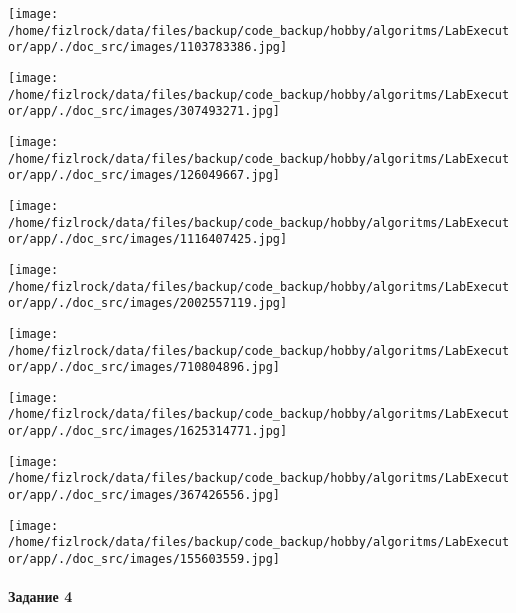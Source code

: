 \documentclass[a4paper, 12pt]{article}
\begin{document}
\texttt{[image: /home/fizlrock/data/files/backup/code\_backup/hobby/algoritms/LabExecutor/app/./doc\_src/images/1103783386.jpg]}

\texttt{[image: /home/fizlrock/data/files/backup/code\_backup/hobby/algoritms/LabExecutor/app/./doc\_src/images/307493271.jpg]}

\texttt{[image: /home/fizlrock/data/files/backup/code\_backup/hobby/algoritms/LabExecutor/app/./doc\_src/images/126049667.jpg]}

\texttt{[image: /home/fizlrock/data/files/backup/code\_backup/hobby/algoritms/LabExecutor/app/./doc\_src/images/1116407425.jpg]}

\texttt{[image: /home/fizlrock/data/files/backup/code\_backup/hobby/algoritms/LabExecutor/app/./doc\_src/images/2002557119.jpg]}

\texttt{[image: /home/fizlrock/data/files/backup/code\_backup/hobby/algoritms/LabExecutor/app/./doc\_src/images/710804896.jpg]}

\texttt{[image: /home/fizlrock/data/files/backup/code\_backup/hobby/algoritms/LabExecutor/app/./doc\_src/images/1625314771.jpg]}

\texttt{[image: /home/fizlrock/data/files/backup/code\_backup/hobby/algoritms/LabExecutor/app/./doc\_src/images/367426556.jpg]}

\texttt{[image: /home/fizlrock/data/files/backup/code\_backup/hobby/algoritms/LabExecutor/app/./doc\_src/images/155603559.jpg]}
\pagebreak
\paragraph{Задание 4}
\end{document}
